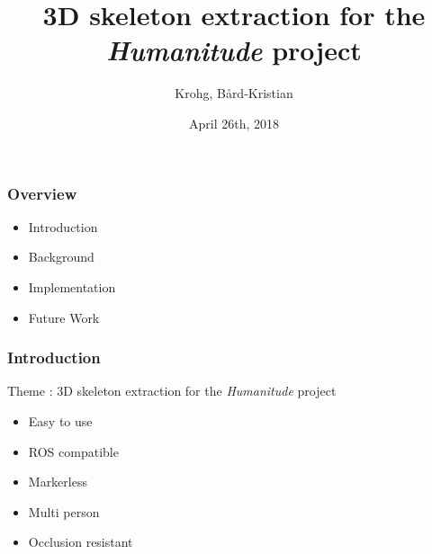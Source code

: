 \documentclass[xcolor=pdftex,dvipsnames,table]{beamer}
\title{3D skeleton extraction for the \emph{Humanitude} project}
\author{Krohg, Bård-Kristian}
\date{April 26th, 2018}
\begin{document}
\maketitle


\begin{frame}
  \frametitle{Overview}
  \begin{itemize}
  \item Introduction
  \item Background
  \item Implementation
  \item Future Work
  \end{itemize}
\end{frame}

\begin{frame}
  \frametitle{Introduction}
  



  Theme : 3D skeleton extraction for the \emph{Humanitude} project
  \begin{itemize}
  \item Easy to use \pause
  \item ROS compatible \pause
  \item Markerless \pause
  \item Multi person \pause
  \item Occlusion resistant
  \end{itemize}
\end{frame}
\end{document}

